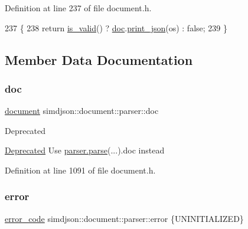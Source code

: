 Definition at line 237 of file document.\+h.


\begin{DoxyCode}
237                                                                     \{
238   \textcolor{keywordflow}{return} \hyperlink{classsimdjson_1_1document_1_1parser_af8bc0c415446f61d6be1a2e3f60a13ad}{is\_valid}() ? \hyperlink{classsimdjson_1_1document_1_1parser_a689e8f23f1e1b63f9e8a3c68ad9517a2}{doc}.\hyperlink{classsimdjson_1_1document_ad33e6862de5cd09b2a16b10a90768360}{print\_json}(os) : \textcolor{keyword}{false};
239 \}
\end{DoxyCode}


\subsection{Member Data Documentation}
\mbox{\label{classsimdjson_1_1document_1_1parser_a689e8f23f1e1b63f9e8a3c68ad9517a2}} 
\subsubsection{\texorpdfstring{doc}{doc}}
{\footnotesize\ttfamily \hyperlink{classsimdjson_1_1document}{document} simdjson\+::document\+::parser\+::doc}

\begin{DoxyRefDesc}{Deprecated}
\item[\hyperlink{deprecated__deprecated000005}{Deprecated}]Use {\ttfamily \hyperlink{classsimdjson_1_1document_1_1parser_a3eb1fd46ea0dad62eceed4b1c302b7ad}{parser.\+parse}(...).doc} instead \end{DoxyRefDesc}


Definition at line 1091 of file document.\+h.

\mbox{\label{classsimdjson_1_1document_1_1parser_afa18e48f1df491d56afdfea2fa353e05}} 
\subsubsection{\texorpdfstring{error}{error}}
{\footnotesize\ttfamily \hyperlink{namespacesimdjson_a7b735a3a50ba79e3f7f14df5f77d8da9}{error\+\_\+code} simdjson\+::document\+::parser\+::error \{U\+N\+I\+N\+I\+T\+I\+A\+L\+I\+Z\+ED\}}

